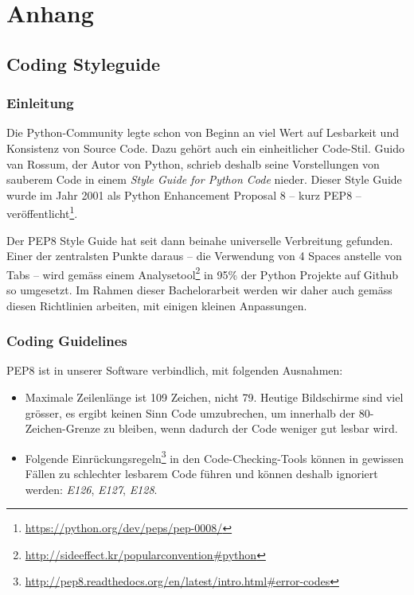 \chapter{Anhang}

\section{Coding Styleguide}
\label{anhang:coding-styleguide}

\subsection{Einleitung}

Die Python-Community legte schon von Beginn an viel Wert auf Lesbarkeit und
Konsistenz von Source Code. Dazu gehört auch ein einheitlicher Code-Stil.  Guido
van Rossum, der Autor von Python, schrieb deshalb seine Vorstellungen von
sauberem Code in einem \textit{Style Guide for Python Code} nieder. Dieser Style
Guide wurde im Jahr 2001 als Python Enhancement Proposal 8 -- kurz PEP8 --
veröffentlicht\footnote{\url{https://python.org/dev/peps/pep-0008/}}.

Der PEP8 Style Guide hat seit dann beinahe universelle Verbreitung gefunden.
Einer der zentralsten Punkte daraus -- die Verwendung von 4 Spaces anstelle von
Tabs -- wird gemäss einem
Analysetool\footnote{\url{http://sideeffect.kr/popularconvention\#python}} in
95\% der Python Projekte auf Github so umgesetzt. Im Rahmen dieser Bachelorarbeit
werden wir daher auch gemäss diesen Richtlinien arbeiten, mit einigen kleinen
Anpassungen.

\subsection{Coding Guidelines}

PEP8 ist in unserer Software verbindlich, mit folgenden Ausnahmen:

\begin{itemize}
	\item Maximale Zeilenlänge ist 109 Zeichen, nicht 79. Heutige Bildschirme sind
		viel grösser, es ergibt keinen Sinn Code umzubrechen, um innerhalb der
		80-Zeichen-Grenze zu bleiben, wenn dadurch der Code weniger gut lesbar wird.
	\item Folgende
		Einrückungsregeln\footnote{\url{http://pep8.readthedocs.org/en/latest/intro.html\#error-codes}}
		in den Code-Checking-Tools können in gewissen Fällen zu schlechter lesbarem
		Code führen und können deshalb ignoriert werden: \textit{E126},
		\textit{E127}, \textit{E128}.
\end{itemize}


